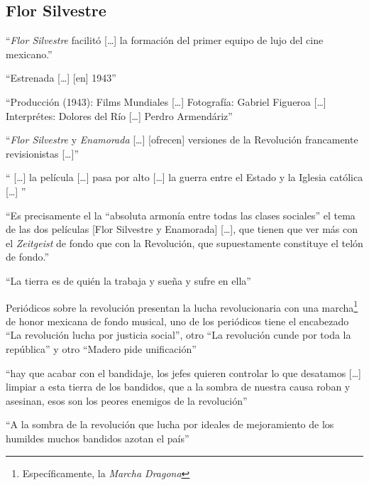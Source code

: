\subsection{Flor Silvestre}
    \begin{compactitem}
    \item ``\emph{Flor Silvestre} facilitó [\ldots] la formación del primer equipo de lujo del cine mexicano.''\autocite[19]{garcia_riera_historia_1992}
    \item ``Estrenada [\ldots] [en] 1943''\autocite[17]{garcia_riera_historia_1992}
    \item ``Producción (1943): Films Mundiales [\ldots] Fotografía: Gabriel Figueroa [\ldots] Interprétes: Dolores del Río [\ldots] Perdro Armendáriz''\autocite[16]{garcia_riera_historia_1992}
    \item ``\emph{Flor Silvestre} y \emph{Enamorada} [\ldots] [ofrecen] versiones de la Revolución francamente revisionistas [\ldots]''\autocite[369]{sanchez_vi._2010}
    \item `` [\ldots] la película [\ldots] pasa por alto [\ldots] la guerra entre el Estado y la Iglesia católica [\ldots] ''\autocite[370]{sanchez_vi._2010}
    \item ``Es precisamente el la ``absoluta armonía entre todas las clases sociales'' el tema de las dos películas [Flor Silvestre y Enamorada] [\ldots], que tienen que ver más con el \emph{Zeitgeist} de fondo que con la Revolución, que supuestamente constituye el telón de fondo.''\autocite[365]{sanchez_vi._2010}
    \item ``La tierra es de quién la trabaja y sueña y sufre en ella''\autocite[11:14]{fernandez_flor_1943}
    \item  Periódicos sobre la revolución presentan la lucha revolucionaria con una marcha\footnote{Específicamente, la \emph{Marcha Dragona}} de honor mexicana de fondo musical, uno de los periódicos tiene el encabezado ``La revolución lucha por justicia social'', otro ``La revolución cunde por toda la república'' y otro ``Madero pide unificación''\autocite[42:38-43:20]{fernandez_flor_1943}
    \item ``hay que acabar con el bandidaje, los jefes quieren controlar lo que desatamos [\ldots] limpiar a esta tierra de los bandidos, que a la sombra de nuestra causa roban y asesinan, esos son los peores enemigos de la revolución''\autocite[48:07-48:40]{fernandez_flor_1943}
    \item ``A la sombra de la revolución que lucha por ideales de mejoramiento de los humildes muchos bandidos azotan el país''\autocite[1:21:40]{fernandez_flor_1943}

\end{compactitem}
